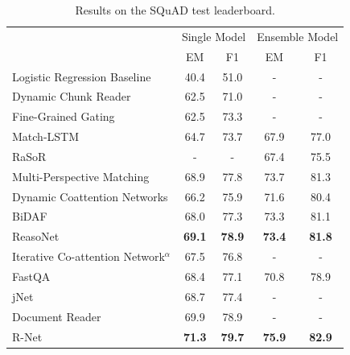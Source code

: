 \documentclass[sigconf]{acmart}
\begin{document}
\begin{table}%
	\centering
	{\small 	
		\caption{{Results on the SQuAD test leaderboard.}}
		\label{tab:squad_results}
		\begin{tabular}{lcccc}
			\toprule
			& \multicolumn{2}{c}{Single Model}  &  \multicolumn{2}{c}{Ensemble Model} \\
			\cmidrule{1-5}
			& EM & F1 & EM & F1 \\
			{Logistic Regression Baseline \citep{Squad2016}} & 40.4 & 51.0 & - & - \\    
			{Dynamic Chunk Reader \citep{DBLP:journals/corr/YuZHYXZ16}} & 62.5 & 71.0 & - & - \\
			{Fine-Grained Gating \citep{DBLP:journals/corr/YangDYHCS16}} 		  & 62.5 & 73.3 & -    & - 	  \\
			{Match-LSTM \citep{DBLP:journals/corr/WangJ16a}} 	      & 64.7 & 73.7 & 67.9 & 77.0 \\
			{RaSoR \citep{DBLP:journals/corr/LeeKP016}} 			 &  - &  - & 67.4 & 75.5  \\
			{Multi-Perspective Matching \citep{IBM_MC_2016}}      & 68.9 & 77.8 & 73.7 & 81.3 \\ 
			{Dynamic Coattention Networks \citep{DBLP:journals/corr/XiongZS16}} & 66.2 & 75.9 & 71.6 & 80.4 \\
			{BiDAF \citep{Dhingra2016Gated}} & 68.0 & 77.3 & 73.3 & 81.1  \\
			{ReasoNet} &  \textbf{69.1} & \textbf{78.9} & \textbf{73.4} & \textbf{81.8} \\	
			\cmidrule{1-5}			
			{Iterative Co-attention Network$^{\alpha}$} & 67.5 & 76.8 & - & -  \\
			{FastQA \citep{DBLP:journals/corr/WeissenbornWS17}} &  68.4 & 77.1 & 70.8 & 78.9 \\
			
			{jNet \citep{DBLP:journals/corr/ZhangZCDWJ17}} & 68.7 & 77.4 & - & - \\
			{Document Reader \cite{DBLP:journals/corr/ChenFWB17}} &  69.9 & 78.9 & - & -  \\
			{R-Net \citep{rnet}} &  \textbf{71.3} & \textbf{79.7} & \textbf{75.9} & \textbf{82.9}   \\
			\bottomrule
		\end{tabular}
	}
\end{table}
\end{document}

